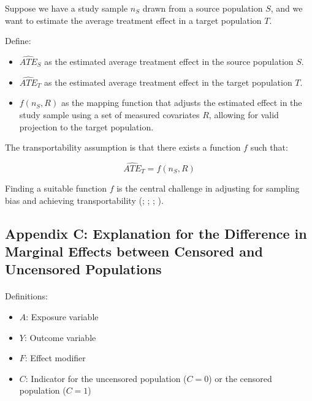 \documentclass[
  single column]{article}
\makeatletter
\let\oldparagraph\paragraph
\renewcommand{\paragraph}{
    \@ifstar
      \xxxParagraphStar
      \xxxParagraphNoStar
  }
\newcommand{\xxxParagraphStar}[1]{\oldparagraph*{#1}\mbox{}}
\newcommand{\xxxParagraphNoStar}[1]{\oldparagraph{#1}\mbox{}}
\providecommand{\tightlist}{%
  \setlength{\itemsep}{0pt}\setlength{\parskip}{0pt}}\usepackage{longtable,booktabs,array}
\makeatother
\begin{document}
Suppose we have a study sample \(n_S\) drawn from a source population
\(S\), and we want to estimate the average treatment effect in a target
population \(T\).

Define:

\begin{itemize}
\tightlist
\item
  \(\widehat{ATE}_{S}\) as the estimated average treatment effect in the
  source population \(S\).
\item
  \(\widehat{ATE}_{T}\) as the estimated average treatment effect in the
  target population \(T\).
\item
  \(f(n_S, R)\) as the mapping function that adjusts the estimated
  effect in the study sample using a set of measured covariates \(R\),
  allowing for valid projection to the target population.
\end{itemize}

The transportability assumption is that there exists a function \(f\)
such that:

\[
\widehat{ATE}_{T} = f(n_S, R)
\]

Finding a suitable function \(f\) is the central challenge in adjusting
for sampling bias and achieving transportability
(;
;
;
).

\newpage{}

\subsection{Appendix C: Explanation for the Difference in Marginal
Effects between Censored and Uncensored Populations}\label{id-app-c}

\paragraph{Definitions:}\label{definitions}

\begin{itemize}
\tightlist
\item
  \textbf{\(A\)}: Exposure variable
\item
  \textbf{\(Y\)}: Outcome variable
\item
  \textbf{\(F\)}: Effect modifier
\item
  \textbf{\(C\)}: Indicator for the uncensored population (\(C = 0\)) or
  the censored population (\(C = 1\))
\end{itemize}
\end{document}
